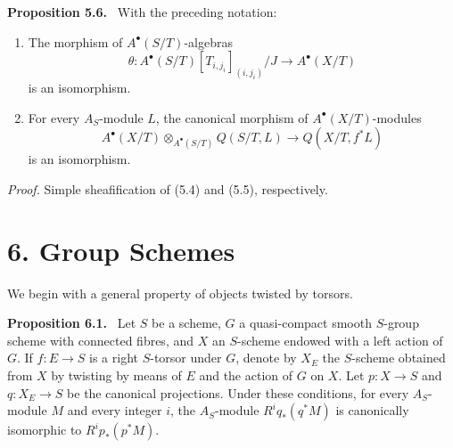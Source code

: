 \documentclass[11pt]{article}
\newenvironment{statement}[1]{\par\medskip\noindent\textbf{#1.}\ }{\par\medskip}
\begin{document}
\begin{statement}{Proposition 5.6}
With the preceding notation:
\begin{enumerate}[label=\alph*)]
\item The morphism of $A^\bullet(S/T)$-algebras
\[
\theta:A^\bullet(S/T)[T_{i,j_i}]_{(i,j_i)}/J\to A^\bullet(X/T)
\]
is an isomorphism.
\item For every $A_S$-module $L$, the canonical morphism of $A^\bullet(X/T)$-modules
\[
A^\bullet(X/T)\otimes_{A^\bullet(S/T)}Q(S/T,L)\to Q(X/T,f^*L)
\]
is an isomorphism.
\end{enumerate}
\end{statement}

\emph{Proof.} Simple sheafification of (5.4) and (5.5), respectively.

\section*{6. Group Schemes}

We begin with a general property of objects twisted by torsors.

\begin{statement}{Proposition 6.1}
Let $S$ be a scheme, $G$ a quasi-compact smooth $S$-group scheme with connected fibres, and $X$ an $S$-scheme endowed with a left action of $G$. If $f:E\to S$ is a right $S$-torsor under $G$, denote by $X_E$ the $S$-scheme obtained from $X$ by twisting by means of $E$ and the action of $G$ on $X$. Let $p:X\to S$ and $q:X_E\to S$ be the canonical projections. Under these conditions, for every $A_S$-module $M$ and every integer $i$, the $A_S$-module $R^iq_*(q^*M)$ is canonically isomorphic to $R^ip_*(p^*M)$.
\end{statement}
\end{document}
